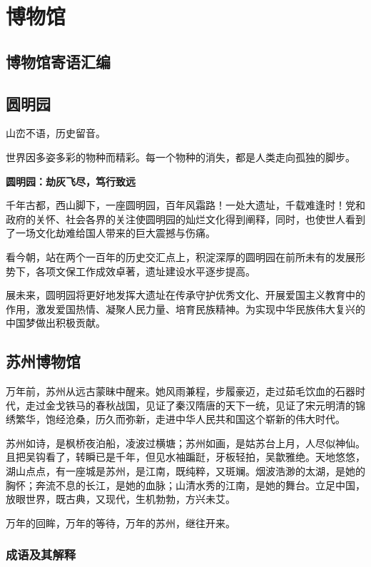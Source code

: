 \chapter{博物馆}

\section{博物馆寄语汇编}


\section*{圆明园}

山峦不语，历史留音。

世界因多姿多彩的物种而精彩。每一个物种的消失，都是人类走向孤独的脚步。

\medskip

\noindent\textbf{圆明园：劫灰飞尽，笃行致远}

千年古都，西山脚下，一座圆明园，百年风霜路！一处大遗址，千载难逢时！党和政府的关怀、社会各界的关注使圆明园的灿烂文化得到阐释，同时，也使世人看到了一场文化劫难给国人带来的巨大震撼与伤痛。

看今朝，站在两个一百年的历史交汇点上，积淀深厚的圆明园在前所未有的发展形势下，各项文保工作成效卓著，遗址建设水平逐步提高。

展未来，圆明园将更好地发挥大遗址在传承守护优秀文化、开展爱国主义教育中的作用，激发爱国热情、凝聚人民力量、培育民族精神。为实现中华民族伟大复兴的中国梦做出积极贡献。

\newpage

\section*{苏州博物馆}

万年前，苏州从远古蒙昧中醒来。她风雨兼程，步履豪迈，走过茹毛饮血的石器时代，走过金戈铁马的春秋战国，见证了秦汉隋唐的天下一统，见证了宋元明清的锦绣繁华，饱经沧桑，历久而弥新，走进中华人民共和国这个崭新的伟大时代。

苏州如诗，是枫桥夜泊船，凌波过横塘；苏州如画，是姑苏台上月，人尽似神仙。且把吴钩看了，转瞬已是千年，但见水袖蹁跹，牙板轻拍，吴歙雅绝。天地悠悠，湖山点点，有一座城是苏州，是江南，既纯粹，又斑斓。烟波浩渺的太湖，是她的胸怀；奔流不息的长江，是她的血脉；山清水秀的江南，是她的舞台。立足中国，放眼世界，既古典，又现代，生机勃勃，方兴未艾。

万年的回眸，万年的等待，万年的苏州，继往开来。

\subsection*{成语及其解释}

